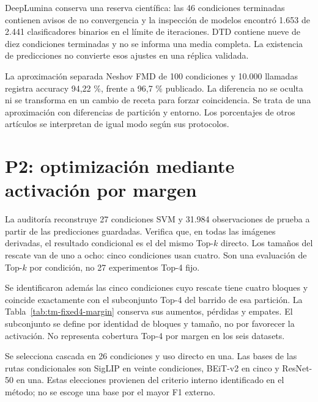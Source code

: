 

DeepLumina conserva una reserva científica: las 46 condiciones terminadas contienen avisos de no convergencia y la inspección de modelos encontró 1.653 de 2.441 clasificadores binarios en el límite de iteraciones. DTD contiene nueve de diez condiciones terminadas y no se informa una media completa. La existencia de predicciones no convierte esos ajustes en una réplica validada.

La aproximación separada Neshov FMD de 100 condiciones y 10.000 llamadas registra accuracy 94,22 \%, frente a 96,7 \% publicado. La diferencia no se oculta ni se transforma en un cambio de receta para forzar coincidencia. Se trata de una aproximación con diferencias de partición y entorno. Los porcentajes de otros artículos se interpretan de igual modo según sus protocolos.

\section{P2: optimización mediante activación por margen}\label{sec:resultados-cascada}
La auditoría reconstruye 27 condiciones SVM y 31.984 observaciones de prueba a partir de las predicciones guardadas. Verifica que, en todas las imágenes derivadas, el resultado condicional es el del mismo Top-\(k\) directo. Los tamaños del rescate van de uno a ocho: cinco condiciones usan cuatro. Son una evaluación de Top-\(k\) por condición, no 27 experimentos Top-4 fijo.




Se identificaron además las cinco condiciones cuyo rescate tiene cuatro bloques y coincide exactamente con el subconjunto Top-4 del barrido de esa partición. La Tabla~\ref{tab:tm-fixed4-margin} conserva sus aumentos, pérdidas y empates. El subconjunto se define por identidad de bloques y tamaño, no por favorecer la activación. No representa cobertura Top-4 por margen en los seis datasets.



Se selecciona cascada en 26 condiciones y uso directo en una. Las bases de las rutas condicionales son SigLIP en veinte condiciones, BEiT-v2 en cinco y ResNet-50 en una. Estas elecciones provienen del criterio interno identificado en el método; no se escoge una base por el mayor F1 externo.

